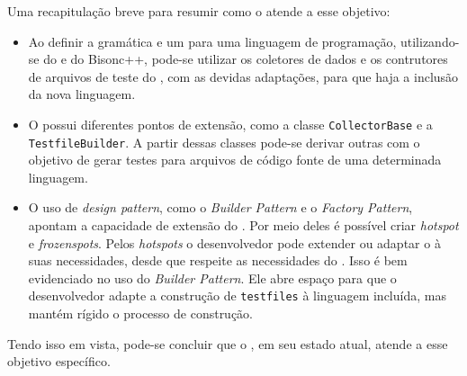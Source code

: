 Uma recapitulação breve para resumir como o \scarefault atende a esse objetivo:
\begin{itemize}
\item Ao definir a gramática e um \parser para uma linguagem de programação,
utilizando-se do \flexcpp e do \textsf{Bisonc++}, pode-se utilizar os coletores
de dados e os contrutores de arquivos de teste do \scarefault, com as devidas
adaptações, para que haja a inclusão da nova linguagem.
\item O \framework possui diferentes pontos de extensão, como a classe
\lstinline|CollectorBase| e a \lstinline|TestfileBuilder|. A partir dessas
classes pode-se derivar outras com o objetivo de gerar testes para arquivos
de código fonte de uma determinada linguagem.
\item O uso de \textit{design pattern}, como o \textit{Builder Pattern} e o
\textit{Factory Pattern}, apontam a capacidade de extensão do \framework. Por
meio deles é possível criar \textit{hotspot} e \textit{frozenspots}. Pelos
\textit{hotspots} o desenvolvedor pode extender ou adaptar o \scarefault à
suas necessidades, desde que respeite as necessidades do \framework. Isso
é bem evidenciado no uso do \textit{Builder Pattern}. Ele abre espaço para
que o desenvolvedor adapte a construção de \lstinline|testfiles| à linguagem
incluída, mas mantém rígido o processo de construção.
\end{itemize}

Tendo isso em vista, pode-se concluir que o \Scarefault, em seu estado atual,
atende a esse objetivo específico.















